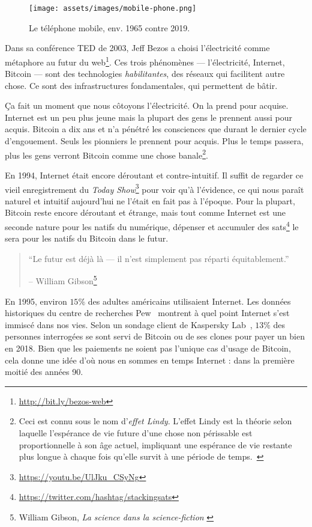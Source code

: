 \begin{figure}
  \texttt{[image: assets/images/mobile-phone.png]}
  \caption{Le téléphone mobile, env. 1965 contre 2019.}
  \label{fig:mobile-phone}
\end{figure}

Dans sa conférence TED de 2003, Jeff Bezos a choisi l'électricité comme
métaphore au futur du web\footnote{\url{http://bit.ly/bezos-web}}. Ces trois
phénomènes --- l'électricité, Internet, Bitcoin --- sont des technologies
\textit{habilitantes}, des réseaux qui facilitent autre chose. Ce sont des
infrastructures fondamentales, qui permettent de bâtir.

Ça fait un moment que nous côtoyons l'électricité. On la prend pour acquise.
Internet est un peu plus jeune mais la plupart des gens le prennent aussi pour
acquis. Bitcoin a dix ans et n'a pénétré les consciences que durant le dernier
cycle d'engouement. Seuls les pionniers le prennent pour acquis. Plus le temps
passera, plus les gens verront Bitcoin comme une chose banale\footnote{Ceci est
connu sous le nom d'\textit{effet Lindy}. L'effet Lindy est la théorie selon
laquelle l'espérance de vie future d'une chose non périssable est
proportionnelle à son âge actuel, impliquant une espérance de vie restante plus
longue à chaque fois qu'elle survit à une période de temps.~\cite{wiki:lindy}}. 

En 1994, Internet était encore déroutant et contre-intuitif. Il suffit de
regarder ce vieil enregistrement du \textit{Today
Show}\footnote{\url{https://youtu.be/UlJku_CSyNg}} pour voir qu'à l'évidence, ce
qui nous paraît naturel et intuitif aujourd'hui ne l'était en fait pas à
l'époque. Pour la plupart, Bitcoin reste encore déroutant et étrange, mais tout
comme Internet est une seconde nature pour les natifs du numérique, dépenser et
accumuler des sats\footnote{\url{https://twitter.com/hashtag/stackingsats}} le
sera pour les natifs du Bitcoin dans le futur.

\begin{quotation}\begin{samepage}
\enquote{Le futur est déjà là --- il n’est simplement pas réparti
équitablement.}
\begin{flushright} -- William Gibson\footnote{William Gibson, \textit{La science
dans la science-fiction} \cite{william-gibson}}
\end{flushright}\end{samepage}\end{quotation}

En 1995, environ $15\%$ des adultes américains utilisaient Internet. Les données
historiques du centre de recherches Pew~\cite{pew-research} montrent à quel
point Internet s'est immiscé dans nos vies. Selon un sondage client de Kaspersky
Lab~\cite{web:kaspersky}, $13\%$ des personnes interrogées se sont servi de
Bitcoin ou de ses clones pour payer un bien en 2018. Bien que les paiements ne
soient pas l'unique cas d'usage de Bitcoin, cela donne une idée d'où nous en
sommes en temps Internet : dans la première moitié des années 90.

